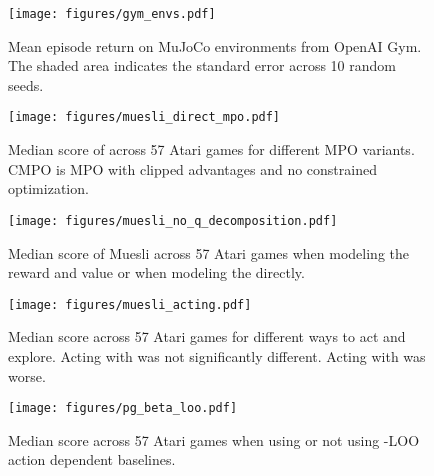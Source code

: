 \documentclass{article}
\begin{document}
\begin{figure*}[tb]
\begin{center}
\centerline{\texttt{[image: figures/gym\_envs.pdf]}}
\vskip -0.25in
\caption{Mean episode return on MuJoCo environments from OpenAI Gym. The shaded area indicates the standard error across 10 random seeds.}
\label{fig:gym_envs}
\end{center}
\vskip -0.2in
\end{figure*}



\twocolumn



\begin{figure}[t]
\vskip 0.2in
\begin{center}
\centerline{\texttt{[image: figures/muesli\_direct\_mpo.pdf]}}
\caption{Median score of across 57 Atari games for different MPO variants. CMPO is MPO with clipped advantages and no constrained optimization.}
\label{fig:muesli_direct_mpo}
\end{center}
\vskip -0.2in
\end{figure}

\begin{figure}[t]
\vskip 0.2in
\begin{center}
\centerline{\texttt{[image: figures/muesli\_no\_q\_decomposition.pdf]}}
\caption{Median score of Muesli across 57 Atari games when modeling the reward and value or when modeling the  directly.}
\label{fig:muesli_no_q_decomposition}
\end{center}
\vskip -0.2in
\end{figure}

\begin{figure}[t]
\vskip 0.2in
\begin{center}
\centerline{\texttt{[image: figures/muesli\_acting.pdf]}}
\caption{Median score across 57 Atari games for different ways to act and explore. Acting with  was not significantly different. Acting with  was worse.}
\label{fig:muesli_acting}
\end{center}
\vskip -0.2in
\end{figure}

\begin{figure}[t]
\begin{center}
\centerline{\texttt{[image: figures/pg\_beta\_loo.pdf]}}
\caption{Median score across 57 Atari games when using or not using -LOO action dependent baselines.}
\label{fig:pg_beta_loo}
\end{center}
\vskip -0.2in
\end{figure}
\end{document}

